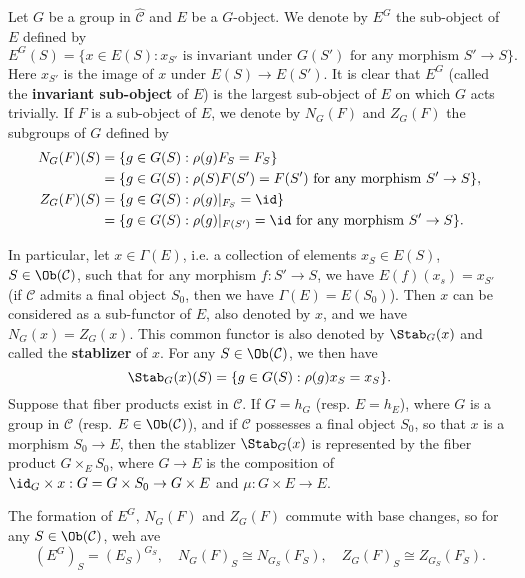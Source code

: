 \begin{definition}
Let $G$ be a group in $\widehat{\mathcal{C}}$ and $E$ be a $G$-object. We denote by $E^G$ the sub-object of $E$ defined by
\[E^G(S)=\{x\in E(S):\text{$x_{S'}$ is invariant under $G(S')$ for any morphism $S'\to S$}\}.\]
Here $x_{S'}$ is the image of $x$ under $E(S)\to E(S')$. It is clear that $E^G$ (called the \textbf{invariant sub-object} of $E$) is the largest sub-object of $E$ on which $G$ acts trivially. If $F$ is a sub-object of $E$, we denote by $N_G(F)$ and $Z_G(F)$ the subgroups of $G$ defined by
\begin{align*}
N_G(F)(S)&=\{g\in G(S):\rho(g)F_S=F_S\}\\
&=\{g\in G(S):\text{$\rho(S)F(S')=F(S')$ for any morphism $S'\to S$}\},\\
Z_G(F)(S)&=\{g\in G(S):\rho(g)|_{F_S}=\id\}\\
&=\{g\in G(S):\text{$\rho(g)|_{F(S')}=\id$ for any morphism $S'\to S$}\}.
\end{align*}
\end{definition}

In particular, let $x\in\Gamma(E)$, i.e. a collection of elements $x_S\in E(S)$, $S\in\Ob(\mathcal{C})$, such that for any morphism $f:S'\to S$, we have $E(f)(x_s)=x_{S'}$ (if $\mathcal{C}$ admits a final object $S_0$, then we have $\Gamma(E)=E(S_0)$). Then $x$ can be considered as a sub-functor of $E$, also denoted by $x$, and we have $N_G(x)=Z_G(x)$. This common functor is also denoted by $\Stab_G(x)$ and called the \textbf{stablizer} of $x$. For any $S\in\Ob(\mathcal{C})$, we then have
\[\Stab_G(x)(S)=\{g\in G(S):\rho(g)x_S=x_S\}.\]
Suppose that fiber products exist in $\mathcal{C}$. If $G=h_G$ (resp. $E=h_E$), where $G$ is a group in $\mathcal{C}$ (resp. $E\in\Ob(\mathcal{C})$), and if $\mathcal{C}$ possesses a final object $S_0$, so that $x$ is a morphism $S_0\to E$, then the stablizer $\Stab_G(x)$ is represented by the fiber product $G\times_ES_0$, where $G\to E$ is the composition of $\id_G\times x:G=G\times S_0\to G\times E$ and $\mu:G\times E\to E$.

\begin{remark}
The formation of $E^G$, $N_G(F)$ and $Z_G(F)$ commute with base changes, so for any $S\in\Ob(\mathcal{C})$, weh ave
\[(E^G)_S=(E_S)^{G_S},\quad N_G(F)_S\cong N_{G_S}(F_S),\quad Z_G(F)_S\cong Z_{G_S}(F_S).\]
\end{remark}

